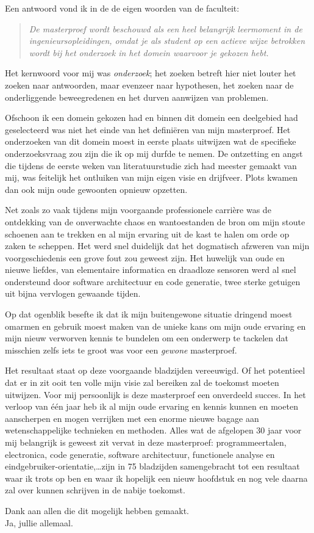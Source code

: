 Een antwoord vond ik in de de eigen woorden van de faculteit:
\begin{quote}
\emph{De masterproef wordt beschouwd als een heel belangrijk leermoment in de
ingenieursopleidingen, omdat je als student op een actieve wijze betrokken
wordt bij het onderzoek in het domein waarvoor je gekozen hebt.}
\end{quote}

Het kernwoord voor mij was \emph{onderzoek}; het zoeken betreft hier niet
louter het zoeken naar antwoorden, maar evenzeer naar hypothesen, het zoeken
naar de onderliggende beweegredenen en het durven aanwijzen van problemen.

Ofschoon ik een domein gekozen had en binnen dit domein een deelgebied had
geselecteerd was niet het einde van het defini\"eren van mijn masterproef. Het
onderzoeken van dit domein moest in eerste plaats uitwijzen wat de specifieke
onderzoeksvraag zou zijn die ik op mij durfde te nemen. De ontzetting en angst
die tijdens de eerste weken van literatuurstudie zich had meester gemaakt van
mij, was feitelijk het ontluiken van mijn eigen visie en drijfveer. Plots
kwamen dan ook mijn oude gewoonten opnieuw opzetten.

Net zoals zo vaak tijdens mijn voorgaande professionele carri\`ere was de
ontdekking van de onverwachte chaos en wantoestanden de bron om mijn stoute
schoenen aan te trekken en al mijn ervaring uit de kast te halen om orde op
zaken te scheppen. Het werd snel duidelijk dat het dogmatisch afzweren van mijn
voorgeschiedenis een grove fout zou geweest zijn. Het huwelijk van oude en
nieuwe liefdes, van elementaire informatica en draadloze sensoren werd al snel
ondersteund door software architectuur en code generatie, twee sterke getuigen
uit bijna vervlogen gewaande tijden.

Op dat ogenblik besefte ik dat ik mijn buitengewone situatie dringend moest
omarmen en gebruik moest maken van de unieke kans om mijn oude ervaring en mijn
nieuw verworven kennis te bundelen om een onderwerp te tackelen dat misschien
zelfs iets te groot was voor een \emph{gewone} masterproef.

Het resultaat staat op deze voorgaande bladzijden vereeuwigd. Of het potentieel
dat er in zit ooit ten volle mijn visie zal bereiken zal de toekomst moeten
uitwijzen. Voor mij persoonlijk is deze masterproef een onverdeeld succes. In
het verloop van \'e\'en jaar heb ik al mijn oude ervaring en kennis kunnen en
moeten aanscherpen en mogen verrijken met een enorme nieuwe bagage aan
wetenschappelijke technieken en methoden. Alles wat de afgelopen 30 jaar voor
mij belangrijk is geweest zit vervat in deze masterproef: programmeertalen,
electronica, code generatie, software architectuur, functionele analyse en
eindgebruiker-orientatie,\dots zijn in 75 bladzijden samengebracht tot een
resultaat waar ik trots op ben en waar ik hopelijk een nieuw hoofdstuk en nog
vele daarna zal over kunnen schrijven in de nabije toekomst.

\bigskip

Dank aan allen die dit mogelijk hebben gemaakt.\\
Ja, jullie allemaal.
